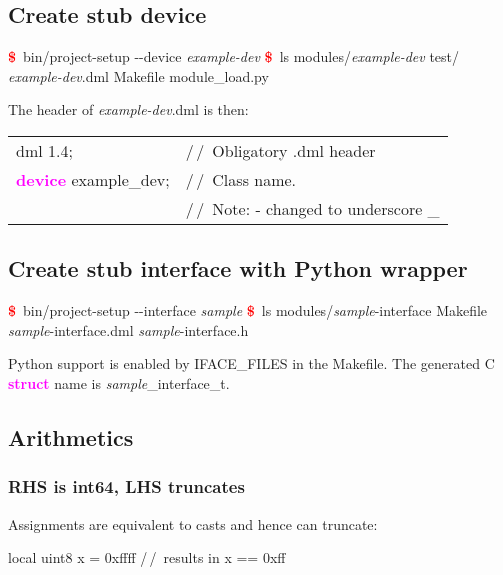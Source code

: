 \documentclass[8pt]{extarticle}
\DeclareRobustCommand{\bseries}{\fontseries{b}\selectfont}
\newenvironment{code}[1][]{%
\begin{prebox}[#1]\obeylines}{%
\end{prebox}}
\newcommand{\cod}[1]{\colorbox{green!15}{#1}}
\newcommand{\prompt}{\textcolor{red}{\textbf{\$}\ }}
\newcommand{\kw}[1]{\textcolor{magenta}{\textbf{#1}}}
\newcommand{\cmtd}[1]{\textcolor{Sepia}{{\bseries/\,/\ #1}}}
\newcommand{\p}[1]{\textit{\large#1}}
\begin{document}
\begin{multicols*}{3}
\subsection{Create stub device}

\begin{code}
    \prompt bin/project-setup -{}-device \p{example-dev}
    \prompt ls modules/\p{example-dev}
    test/  \p{example-dev}.dml  Makefile  module\_load.py
\end{code}

The header of \p{example-dev}.dml is then:

\begin{code}
    \begin{tabular}{ll}
        dml 1.4;                  & \cmtd{Obligatory .dml header} \\
        \kw{device} example\_dev; & \cmtd{Class name.} \\
                                  & \cmtd{Note: - changed to underscore \_}
    \end{tabular}
\end{code}

\subsection{Create stub interface with Python wrapper}

\begin{code}
    \prompt bin/project-setup -{}-interface \p{sample}
    \prompt ls modules/\p{sample}-interface
    Makefile  \p{sample}-interface.dml  \p{sample}-interface.h
\end{code}

Python support is enabled by \cod{IFACE\_FILES} in the Makefile.
The generated C \kw{struct} name is \cod{\p{sample}\_interface\_t}.

\subsection{Arithmetics}

\subsubsection{RHS is int64, LHS truncates}

Assignments are equivalent to casts and hence can truncate:
        \begin{code}
            local uint8 x = 0xffff  \cmtd{results in x == 0xff}
        \end{code}


\end{multicols*}
\end{document}
